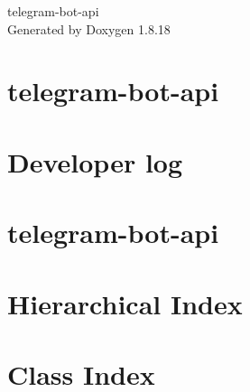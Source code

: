 \let\mypdfximage\pdfximage\def\pdfximage{\immediate\mypdfximage}\documentclass[twoside]{book}
\newcommand{\+}{\discretionary{\mbox{\scriptsize$\hookleftarrow$}}{}{}}
\newcommand{\clearemptydoublepage}{%
  \newpage{\pagestyle{empty}\cleardoublepage}%
}
\begin{document}
\hypersetup{pageanchor=false,
             bookmarksnumbered=true,
             pdfencoding=unicode
            }
\begin{titlepage}
\vspace*{7cm}
\begin{center}%
{\Large telegram-\/bot-\/api }\\
\vspace*{1cm}
{\large Generated by Doxygen 1.8.18}\\
\end{center}
\end{titlepage}
\clearemptydoublepage
{}
\tableofcontents
\clearemptydoublepage
{}
\hypersetup{pageanchor=true}

\chapter{telegram-\/bot-\/api}
\label{index}\hypertarget{index}{}
\chapter{Developer log}
\label{dev-log}

\chapter{telegram-\/bot-\/api}
\label{md_README}

\chapter{Hierarchical Index}

\chapter{Class Index}

\end{document}
